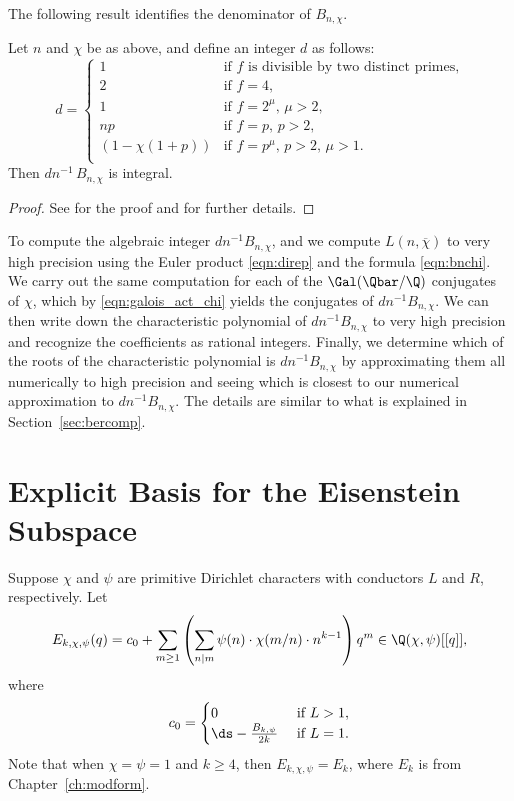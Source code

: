 The following result
identifies the denominator of $B_{n,\chi}$.
\begin{theorem}
Let $n$ and $\chi$ be as above, and
  define an integer $d$ as follows:
  $$
  d =
  \begin{cases}
    1    & \text{if $f$ is divisible by two distinct primes,}\\
    2 & \text{if $f=4$,}\\
    1 & \text{if $f=2^\mu$, $\mu>2$,}\\
    np   & \text{if $f=p$, $p>2$,}\\
    (1-\chi(1+p)) & \text{if $f=p^\mu$, $p>2$, $\mu>1$.}\\    
  \end{cases}
  $$
Then $dn^{-1}\,B_{n,\chi}$ is integral.
\end{theorem}
\begin{proof}
See \cite{carlitz1} for the proof and \cite{carlitz2}
for further details.
\end{proof}


To compute the algebraic integer $d n^{-1} B_{n,\chi}$, and we compute
$L(n,\overline{\chi})$ to very high precision using the Euler product
\eqref{eqn:direp} and the formula \eqref{eqn:bnchi}.  We carry out the
same computation for each of the $\Gal(\Qbar/\Q)$ conjugates of
$\chi$, which by \eqref{eqn:galois_act_chi} yields the conjugates of
$d n^{-1} B_{n,\chi}$.  We can then write down the characteristic
polynomial of $d n^{-1} B_{n,\chi}$ to very high precision and
recognize the coefficients as rational integers.  Finally, we determine
which of the roots of the characteristic polynomial is $d n^{-1}
B_{n,\chi}$ by approximating them all numerically to high precision
and seeing which is closest to our numerical approximation to $d
n^{-1} B_{n,\chi}$.  The details are similar
to what is explained in Section~\ref{sec:bercomp}.


\section{Explicit Basis for the Eisenstein Subspace}

Suppose $\chi$ and $\psi$ are primitive Dirichlet characters with
conductors $L$ and $R$, respectively.  
Let
\begin{equation}\label{eqn:eisen}
 E_{k,\chi,\psi}(q) = c_0 + \sum_{m \geq 1} \left(
                  \sum_{n|m} \psi(n) \cdot \chi(m/n) \cdot n^{k-1}\right) q^{m}
\in \Q(\chi, \psi)[[q]],
\end{equation}
where 
$$
c_0 = \begin{cases} 0 & \text{ if } L>1, \\
\ds- \frac{B_{k,\psi}}{2k} & \text{ if } L=1.
\end{cases}
$$
Note that when $\chi=\psi=1$ and $k\geq 4$, then $E_{k,\chi,\psi} = E_k$,
where $E_k$ is from Chapter~\ref{ch:modform}.

